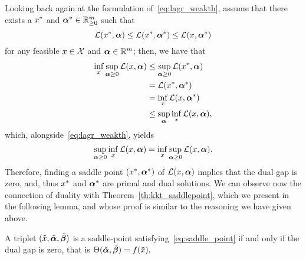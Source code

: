 Looking back again at the formulation of~\eqref{eq:lagr_weakth}, assume that there exists a ${x}^*$ and ${\bm{\alpha}}^* \in \mathbb{R}^{m}_{\geq 0}$ such that 
\begin{equation}
    \nonumber
    \mathcal{L}({x}^*, \bm{\alpha}) \leq \mathcal{L}({x}^*, {\bm{\alpha}}^*) \leq \mathcal{L}(x, {\bm{\alpha}}^*)
\end{equation}
for any feasible $x \in \mathcal{X}$ and $\bm{\alpha} \in \mathbb{R}^m$; then, we have that 
\begin{equation}
    \nonumber
    \begin{aligned}
        \inf_{x} \sup_{\bm{\alpha} \geq 0} \mathcal{L}(x, \bm{\alpha}) &\leq \sup_{\bm{\alpha} \geq 0} \mathcal{L}({x}^*, \bm{\alpha}) \\
        & = \mathcal{L}({x}^*, {\bm{\alpha}}^*) \\
        & = \inf_{x} \mathcal{L}(x, {\bm{\alpha}}^*) \\
        & \leq \sup_{\bm{\alpha}} \inf_{x} \mathcal{L}(x, \bm{\alpha}), 
    \end{aligned}
\end{equation}
which, alongside~\eqref{eq:lagr_weakth}, yields 
\begin{equation}
    \label{eq:lagr_strongth}
    \sup_{\fv{\alpha} \geq 0} \inf_{x} \lagr(x, \fv{\alpha}) = \inf_{x} \sup_{\fv{\alpha} \geq 0} \lagr(x, \fv{\alpha}).
\end{equation}
Therefore, finding a saddle point $({x}^*, {\bm{\alpha}}^*)$ of $\mathcal{L}(x, \bm{\alpha})$ implies that the dual gap is zero, and, thus ${x}^*$ and ${\bm{\alpha}}^*$ are primal and dual solutions.
%
We can observe now the connection of duality with Theorem~\ref{th:kkt_saddlepoint}, which we present in the following lemma, and whose proof is similar to the reasoning we have given above.
\begin{lemma}
    A triplet $(\tilde{x}, \tilde{\bm{\alpha}}, \tilde{\bm{\beta}})$ is a saddle-point satisfying~\eqref{eq:saddle_point} if and only if the dual gap is zero, that is 
    $ \Theta(\tilde{\bm{\alpha}}, \tilde{\bm{\beta}}) = f(\tilde{x}) .$
\end{lemma}

